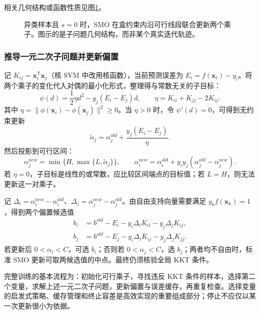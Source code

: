 相关几何结构或函数性质见图\ref{fig:svm-smo}。
\begin{figure}[htbp]\centering
{}
\caption{异类样本且 $s=0$ 时，SMO 在盒约束内沿可行线段联合更新两个乘子。图示的是子问题几何结构，而非某个真实迭代轨迹。}
\label{fig:svm-smo}
\end{figure}

\subsubsection{推导一元二次子问题并更新偏置}

记 $K_{ij}=\boldsymbol x_i^{\mathsf T}\boldsymbol x_j$（核 SVM 中改用核函数），当前预测误差为 $E_i=f(\boldsymbol x_i)-y_i$。将两个乘子的变化代入对偶的最小化形式，整理得与常数无关的子目标：
\[
\psi(d)=\frac12\eta d^2-y_j(E_i-E_j)d,\qquad
\eta=K_{ii}+K_{jj}-2K_{ij}.
\]
其中 $\eta=\|\phi(\boldsymbol x_i)-\phi(\boldsymbol x_j)\|^2\geq0$。当 $\eta>0$ 时，令 $\psi'(d)=0$，可得到无约束更新
\[
\widetilde\alpha_j=\alpha_j^{old}+\frac{y_j(E_i-E_j)}{\eta}.
\]
然后投影到可行区间：
\[
\alpha_j^{new}=\min\{H,\max\{L,\widetilde\alpha_j\}\},\qquad
\alpha_i^{new}=\alpha_i^{old}+y_i y_j(\alpha_j^{old}-\alpha_j^{new}).
\]
若 $\eta=0$，子目标是线性的或常数，应比较区间端点的目标值；若 $L=H$，则无法更新这一对乘子。

记 $\Delta_i=\alpha_i^{new}-\alpha_i^{old}$、$\Delta_j=\alpha_j^{new}-\alpha_j^{old}$。由自由支持向量需要满足 $y_kf(\boldsymbol x_k)=1$，得到两个偏置候选值
\begin{align*}
b_i&=b^{old}-E_i-y_i\Delta_iK_{ii}-y_j\Delta_jK_{ij},\\
b_j&=b^{old}-E_j-y_i\Delta_iK_{ij}-y_j\Delta_jK_{jj}.
\end{align*}
若更新后 $0<\alpha_i<C$，可选 $b_i$；否则若 $0<\alpha_j<C$，选 $b_j$；两者均不自由时，标准 SMO 更新可取两候选值的中点。最终仍须核验全局 KKT 条件。

完整训练的基本流程为：初始化可行乘子，寻找违反 KKT 条件的样本，选择第二个变量，求解上述一元二次子问题，更新偏置与误差缓存，再重复检查。选择变量的启发式策略、缓存管理和终止容差是高效实现的重要组成部分；停止不应仅以某一次更新很小为依据。


